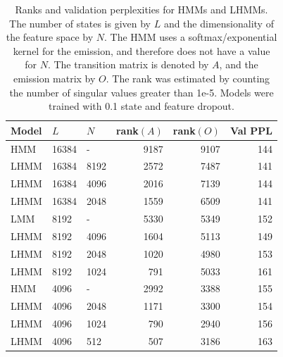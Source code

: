 \documentclass{article}
\begin{document}
\begin{table}[t]
    \centering
    \begin{tabular}{lllrrr}
    \toprule
        Model & $L$ & $N$ & rank$(A)$ & rank$(O)$ & Val PPL  \\
        \midrule
        HMM & 16384 & - & 9187 & 9107 & 144\\ 
        LHMM & 16384 & 8192 & 2572 & 7487 & 141\\
        LHMM & 16384 & 4096 & 2016 & 7139 & 144\\
        LHMM & 16384 & 2048 & 1559 & 6509 & 141\\
        \midrule
        LMM & 8192 & - &  5330 & 5349 & 152\\
        LHMM & 8192 & 4096 & 1604 & 5113 & 149\\
        LHMM & 8192 & 2048 & 1020 & 4980 & 153\\
        LHMM & 8192 & 1024 & 791 & 5033 & 161\\
		\midrule
        HMM & 4096 & - & 2992 & 3388 & 155\\
        LHMM & 4096 & 2048 & 1171 & 3300 & 154\\
        LHMM & 4096 & 1024 & 790 & 2940 & 156\\
        LHMM & 4096 & 512 & 507 & 3186 & 163\\
        \bottomrule
    \end{tabular}
    
    \caption{\label{tbl:hmm-rank}Ranks and validation perplexities for HMMs and LHMMs. The number of states is given by $L$ and the dimensionality of the feature space by $N$. The HMM uses a softmax/exponential kernel for the emission, and therefore does not have a value for $N$. The transition matrix is denoted by $A$, and the emission matrix by $O$. The rank was estimated by counting the number of singular values greater than 1e-5.
    Models were trained with 0.1 state and feature dropout.}
\end{table}
\end{document}
